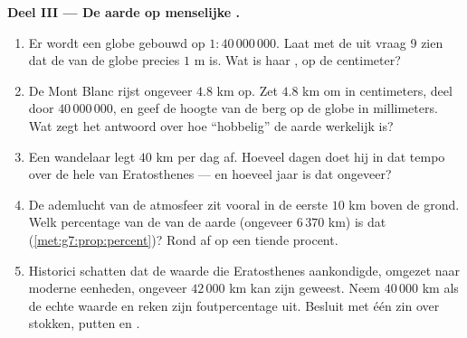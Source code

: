 \begin{problem}
\medskip
\noindent\textbf{Deel III --- De aarde op menselijke .}
\begin{enumerate}[resume]
  \item Er wordt een globe gebouwd op  $1 : 40\,000\,000$. Laat met de 
        uit vraag 9 zien dat de  van de globe precies $1$ m is. Wat is haar
        , op de centimeter?
  \item De Mont Blanc rijst ongeveer $4.8$ km op. Zet $4.8$ km om in centimeters,
        deel door $40\,000\,000$, en geef de hoogte van de berg op de globe in
        millimeters. Wat zegt het antwoord over hoe ``hobbelig'' de aarde
        werkelijk is?
  \item Een wandelaar legt $40$ km per dag af. Hoeveel dagen doet hij in dat tempo
        over de hele  van Eratosthenes --- en hoeveel jaar is dat ongeveer?
  \item De ademlucht van de atmosfeer zit vooral in de eerste $10$ km boven de
        grond. Welk percentage van de  van de aarde (ongeveer $6\,370$ km) is
        dat (\cref{met:g7:prop:percent})? Rond af op een tiende procent.
  \item Historici schatten dat de waarde die Eratosthenes aankondigde, omgezet naar
        moderne eenheden, ongeveer $42\,000$ km kan zijn geweest. Neem $40\,000$ km
        als de echte waarde en reken zijn foutpercentage uit. Besluit met één zin
        over stokken, putten en .
\end{enumerate}
\end{problem}
